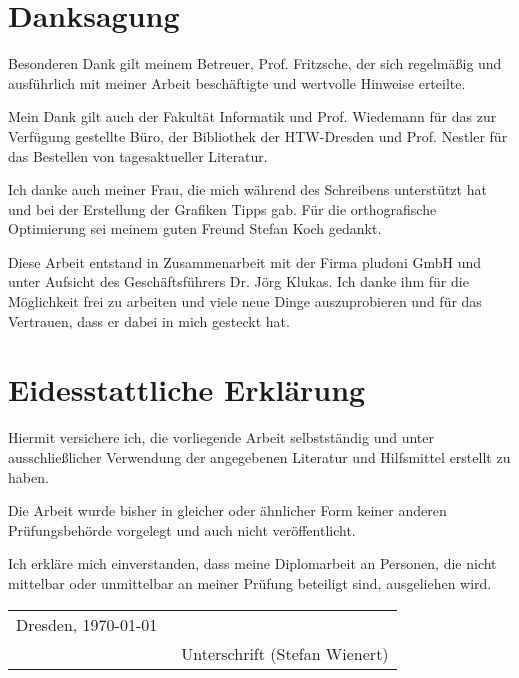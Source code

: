 \tableofcontents		%
\newpage
\chapter*{Danksagung}
 
Besonderen Dank gilt meinem Betreuer, Prof. Fritzsche, der sich regelmäßig und ausführlich mit meiner Arbeit beschäftigte und wertvolle Hinweise erteilte.

Mein Dank gilt auch der Fakultät Informatik und Prof. Wiedemann für das zur Verfügung gestellte Büro, der Bibliothek der HTW-Dresden und Prof. Nestler für das Bestellen von tagesaktueller Literatur.
 
Ich danke auch meiner Frau, die mich während des Schreibens unterstützt hat und bei der Erstellung der Grafiken Tipps gab. Für die orthografische Optimierung sei meinem guten Freund Stefan Koch gedankt.
 
Diese Arbeit entstand in Zusammenarbeit mit der Firma pludoni GmbH und unter Aufsicht des Geschäftsführers Dr. Jörg Klukas. Ich danke ihm für die Möglichkeit frei zu arbeiten und viele neue Dinge auszuprobieren und für das Vertrauen, dass er dabei in mich gesteckt hat.
 
\newpage
\chapter*{Eidesstattliche Erklärung}
	Hiermit versichere ich, die vorliegende Arbeit selbstständig und unter ausschließlicher Verwendung
	der angegebenen Literatur und Hilfsmittel erstellt zu haben.

	Die Arbeit wurde bisher in gleicher oder ähnlicher Form keiner anderen Prüfungsbehörde vorgelegt
	und auch nicht veröffentlicht.\bigskip

Ich erkläre mich einverstanden, dass meine Diplomarbeit an Personen, die nicht mittelbar oder unmittelbar an meiner Prüfung beteiligt sind, ausgeliehen wird.\bigskip

\begin{tabular}{ll}
 
	Dresden, \today & \underline{\qquad \qquad \qquad \qquad \qquad \qquad}\\
	& \small{\ Unterschrift (Stefan Wienert)} 
\end{tabular}


